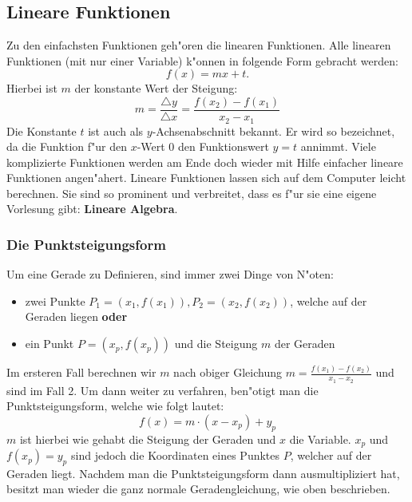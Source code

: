 \subsection{Lineare Funktionen}
Zu den einfachsten Funktionen geh"oren die linearen Funktionen. Alle linearen Funktionen (mit nur einer Variable) k"onnen in folgende Form gebracht werden: 
\begin{equation*}
f(x) = mx+t.
\end{equation*}
Hierbei ist $m$ der konstante Wert der Steigung:
\begin{equation*}
m= \frac{\triangle y}{\triangle x}=\frac{f(x_2)-f(x_1)}{x_2-x_1}
\end{equation*}
Die Konstante $t$ ist auch als $y$-Achsenabschnitt bekannt. Er wird so bezeichnet, da die Funktion f"ur den $x$-Wert $0$ den Funktionswert $y = t$ annimmt. Viele komplizierte Funktionen werden am Ende doch wieder mit Hilfe einfacher lineare Funktionen angen"ahert. Lineare Funktionen lassen sich auf dem Computer leicht berechnen. Sie sind so prominent und verbreitet, dass es f"ur sie eine eigene Vorlesung gibt: \textbf{Lineare Algebra}.


\subsubsection{Die Punktsteigungsform}
Um eine Gerade zu Definieren, sind immer zwei Dinge von N"oten:
\begin{itemize}
\item zwei Punkte $P_1 = (x_1, f(x_1)), P_2 = (x_2, f(x_2))$, welche auf der Geraden liegen \textbf{oder}
\item ein Punkt $P = (x_p, f(x_p))$ und die Steigung $m$ der Geraden
\end{itemize}
Im ersteren Fall berechnen wir $m$ nach obiger Gleichung $m = \frac{f(x_1) - f(x_2)}{x_1 - x_2}$ und sind im Fall 2. Um dann weiter zu verfahren, ben"otigt man die Punktsteigungsform, welche wie folgt lautet:
\begin{equation*}
f(x) = m \cdot (x-x_p) + y_p
\end{equation*}
$m$ ist hierbei wie gehabt die Steigung der Geraden und $x$ die Variable. $x_p$ und $f(x_p) = y_p$ sind jedoch die Koordinaten eines Punktes $P$, welcher auf der Geraden liegt. Nachdem man die Punktsteigungsform dann ausmultipliziert hat, besitzt man wieder die ganz normale Geradengleichung, wie oben beschrieben.

